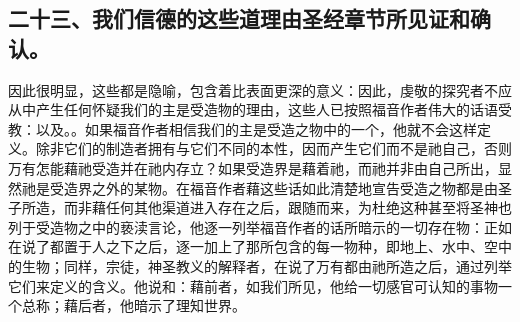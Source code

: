 \subsection{二十三、我们信德的这些道理由圣经章节所见证和确认。}

因此很明显，这些都是隐喻，包含着比表面更深的意义：因此，虔敬的探究者不应从中产生任何怀疑我们的主是受造物的理由，这些人已按照福音作者伟大的话语受教：以及。。如果福音作者相信我们的主是受造之物中的一个，他就不会这样定义。除非它们的制造者拥有与它们不同的本性，因而产生它们而不是祂自己，否则万有怎能藉祂受造并在祂内存立？如果受造界是藉着祂，而祂并非由自己所出，显然祂是受造界之外的某物。在福音作者藉这些话如此清楚地宣告受造之物都是由圣子所造，而非藉任何其他渠道进入存在之后，跟随而来，为杜绝这种甚至将圣神也列于受造物之中的亵渎言论，他逐一列举福音作者的话所暗示的一切存在物：正如在说了都置于人之下之后，逐一加上了那所包含的每一物种，即地上、水中、空中的生物；同样，宗徒，神圣教义的解释者，在说了万有都由祂所造之后，通过列举它们来定义的含义。他说和：藉前者，如我们所见，他给一切感官可认知的事物一个总称；藉后者，他暗示了理知世界。\par

